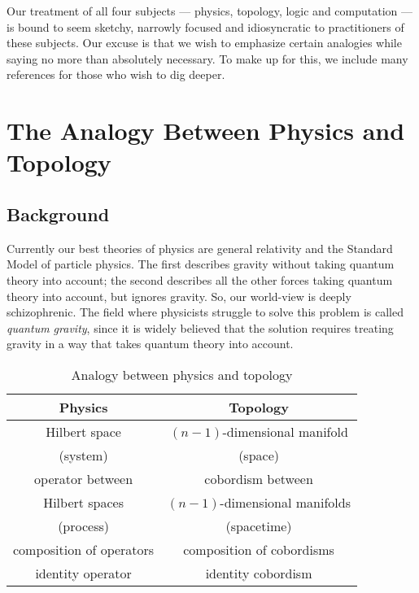 \documentclass[12pt]{article}
\begin{document}
Our treatment of all four subjects --- physics, topology, logic
and computation --- is bound to seem sketchy, narrowly focused
and idiosyncratic to practitioners of these subjects.  Our excuse 
is that we wish to emphasize certain analogies while saying no 
more than absolutely necessary.  To make up for this, we include 
many references for those who wish to dig deeper.

\section{The Analogy Between Physics and Topology}
\label{physics_topology}

\subsection{Background}

Currently our best theories of physics are general relativity 
and the Standard Model of particle physics.  The first describes
gravity without taking quantum theory into account; the second 
describes all the other forces taking quantum theory into account,
but ignores gravity.  So, our world-view is deeply schizophrenic.
The field where physicists struggle to solve this problem is 
called {\em quantum gravity}, since it is widely believed that the
solution requires treating gravity in a way that takes quantum
theory into account.

\begin{table}[h]
\begin{center}
\begin{tabular}{|c|c|}                    \hline
Physics                           &  Topology \\  \hline
Hilbert space                     &  $(n-1)$-dimensional manifold       \\  
(system)                          & (space)             \\  \hline
operator between                  &  cobordism between  \\
Hilbert spaces                    & $(n-1)$-dimensional manifolds \\
(process)                         &  (spacetime)           \\  \hline
composition of operators          &  composition of cobordisms \\  \hline
identity operator                 &  identity cobordism \\  \hline
\end{tabular} 
\\
\caption{Analogy between physics and topology}
\label{analogy2}
\end{center}
\end{table}
\end{document}
